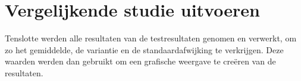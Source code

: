 \section{Vergelijkende studie uitvoeren}
Tenslotte werden alle resultaten van de testresultaten genomen en verwerkt, om zo het
gemiddelde, de variantie en de standaardafwijking te verkrijgen. Deze waarden werden
dan gebruikt om een grafische weergave te creëren van de resultaten.